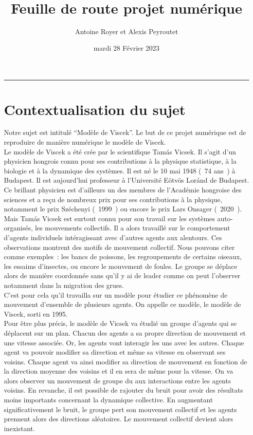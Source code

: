\documentclass[french, a4paper, 12pt]{article}
\title{\sc Feuille de route projet numérique}
\author{Antoine Royer et Alexis Peyroutet}
\date{mardi 28 Février 2023}
\begin{document}
 \maketitle \vspace{3pt} \hrule \vspace{3pt}

\section{Contextualisation du sujet}

      Notre sujet est intitulé ``Modèle de Viscek''. Le but de ce projet numérique est de reproduire de manière numérique le modèle de Viscek.\\
      
      Le modèle de Viscek a été crée par le scientifique Tamás Vicsek. Il s'agit d'un physicien hongrois connu pour ses contributions à la physique statistique, à la biologie et à la dynamique des systèmes. Il est né le 10 mai 1948 (~74 ans~) à Budapest. Il est aujourd'hui professeur à l'Université Eötvös Loránd de Budapest. Ce brillant physicien est d'ailleurs un des membres de l'Académie hongroise des sciences et a reçu de nombreux prix pour ses contributions à la physique, notamment le prix Széchenyi (~1999~) ou encore le prix Lars Onsager (~2020~).\\


      Mais Tamás Vicsek est surtout connu pour son travail sur les systèmes auto-organisés, les mouvements collectifs. Il a alors travaillé sur le comportement d'agents individuels intéragissant avec d'autres agents aux alentours. Ces observations montrent des motifs de mouvement collectif. Nous pouvons citer comme exemples~: les bancs de poissons, les regroupements de certains oiseaux, les essaims d'insectes, ou encore le mouvement de foules. Le groupe se déplace alors de manière coordonnée sans qu'il y ai de leader comme on peut l'observer notamment dans la migration des grues.\\
      
      C'est pour cela qu'il travailla sur un modèle pour étudier ce phénomène de mouvement d'ensemble de plusieurs agents. On appelle ce modèle, le modèle de Viscek, sorti en 1995.\\
      
      Pour être plus précis, le modèle de Vicsek va étudié un groupe d'agents qui se déplacent sur un plan. Chacun des agents a sa propre direction de mouvement et une vitesse associée. Or, les agents vont interagir les uns avec les autres. Chaque agent va pouvoir modifier sa direction et même sa vitesse en observant ses voisins. Chaque agent va ainsi modifier sa direction de mouvement en fonction de la direction moyenne des voisins et il en sera de même pour la vitesse.  On va alors observer un mouvement de groupe du aux interactions entre les agents voisins. En revanche, il est possible de rajouter du bruit pour avoir des résultats moins importants concernant la dynamique collective. En augmentant significativement le bruit, le groupe pert son mouvement collectif et les agents prennent alors des directions aléatoires. Le mouvement collectif devient alors inexistant.\\
      
\end{document}
